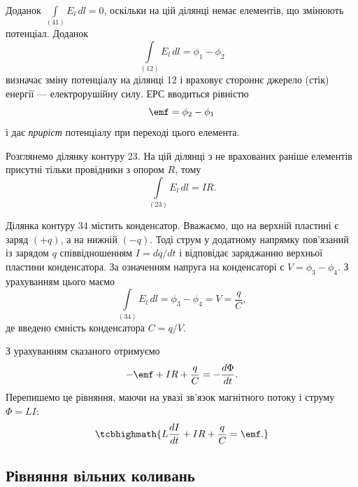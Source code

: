 Доданок $\int\limits_{(41)} E_l \, dl = 0$, оскільки на цій ділянці немає елементів, що
змінюють потенціал. Доданок
\begin{equation}\label{eq:phi12}
	\int\limits_{(12)} E_l \, dl = \phi_1 - \phi_2
\end{equation}
визначає зміну потенціалу на ділянці 12 і враховує стороннє
джерело (стік) енергії --- електрорушійну силу. ЕРС вводиться
рівністю
\begin{equation}\label{eq:EMF_definition}
	\emf = \phi_2 - \phi_1
\end{equation}
і дає \emph{приріст} потенціалу при переході цього елемента.

Розглянемо ділянку контуру 23. На цій ділянці з не врахованих
раніше елементів присутні тільки провідники з опором $R$, тому
\begin{equation}\label{eq:IR}
	\int\limits_{(23)} E_l \, dl = IR.
\end{equation}

Ділянка контуру 34 містить конденсатор. Вважаємо, що на верхній
пластині є заряд $(+q)$, а на нижній $(-q)$. Тоді струм у додатному
напрямку пов'язаний із зарядом $q$ співвідношенням $I = dq/dt$ і
відповідає заряджанню верхньої пластини конденсатора. За означенням
напруга на конденсаторі є $V = \phi_3 - \phi_4$. З урахуванням цього маємо
\begin{equation}\label{eq:capacitor_voltage}
	\int\limits_{(34)} E_l \, dl = \phi_3 - \phi_4 = V = \frac{q}{C},
\end{equation}
де введено ємність конденсатора $C = q/V$.

З урахуванням сказаного отримуємо
\begin{equation}\label{eq:circuit_equation_raw}
	-\emf + IR + \frac{q}{C} = -\frac{d\Phi}{dt}.
\end{equation}
Перепишемо це рівняння, маючи на увазі зв'язок магнітного потоку і струму
$\Phi = LI$:
\begin{equation}\label{eq:circuit_equation}
	\tcbhighmath{
		L\frac{dI}{dt} + IR + \frac{q}{C} = \emf.
	}
\end{equation}

\subsection*{Рівняння вільних коливань}

